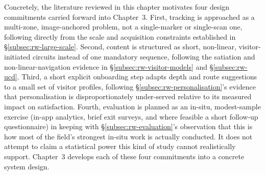 Concretely, the literature reviewed in this chapter motivates four design
commitments carried forward into Chapter~3. First, tracking is approached
as a multi-zone, image-anchored problem, not a single-marker or
single-scan one, following directly from the scale and acquisition
constraints established in \S\ref{subsec:rw-large-scale}. Second, content
is structured as short, non-linear, visitor-initiated circuits instead of
one mandatory sequence, following the satiation and non-linear-navigation
evidence in \S\ref{subsec:rw-visitor-models} and
\S\ref{subsec:rw-ucd}. Third, a short explicit onboarding step adapts
depth and route suggestions to a small set of visitor profiles, following
\S\ref{subsec:rw-personalisation}'s evidence that personalisation is
disproportionately under-served relative to its measured impact on
satisfaction. Fourth, evaluation is planned as an in-situ,
modest-sample exercise (in-app analytics, brief exit surveys, and where feasible a short follow-up questionnaire) in keeping with
\S\ref{subsec:rw-evaluation}'s observation that this is how most of the
field's strongest in-situ work is actually conducted. It does not
attempt to claim a statistical power this kind of study cannot
realistically support. Chapter~3 develops each of these four commitments
into a concrete system design.